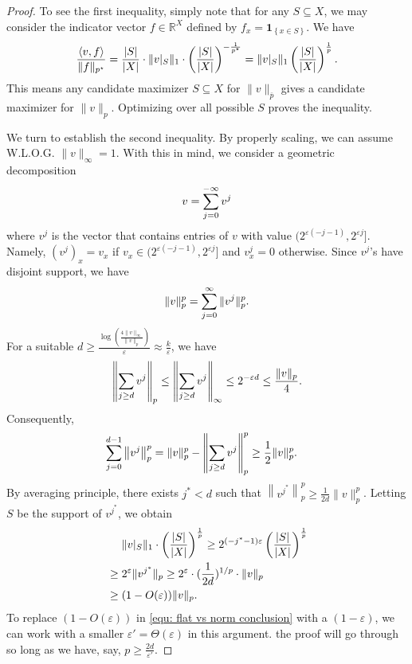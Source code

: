 \documentclass[11pt]{article}
\newcommand{\1}{ \mathbbm{1}}
\newcommand{\one}[1]{\mathbf{1}_{\left\{#1\right\}}}
\newcommand{\eps}{\varepsilon}
\begin{document}
\begin{proof}
    To see the first inequality, simply note that for any $S\subseteq X$, we may consider the indicator vector $f\in \mathbb{R}^{X}$ defined by $f_x = \one{x\in S}$. We have
    \begin{align}
        \frac{\langle v, f\rangle}{\|f\|_{p^\star}} = \frac{|S|}{|X|} \cdot \| v|_S \|_1 \cdot \left( \frac{|S|}{|X|} \right)^{-\frac{1}{p^\star}}  = \| v|_S\|_1 \left( \frac{|S|}{|X|} \right)^{\frac{1}{p}}.  \notag
    \end{align}
    This means any candidate maximizer $S\subseteq X$ for $\|v\|_{\overline{p}}$ gives a candidate maximizer for $\|v\|_{p}$. Optimizing over all possible $S$ proves the inequality.

    We turn to establish the second inequality. By properly scaling, we can assume W.L.O.G. $\|v\|_{\infty} = 1$. With this in mind, we consider a geometric decomposition 
    \begin{align}
        v = \sum_{j=0}^{-\infty} v^j \notag
    \end{align}
    where $v^j$ is the vector that contains entries of $v$ with value $(2^{\eps (-j-1)},2^{\eps j}]$. Namely, $(v^j)_x = v_x$ if $v_x \in (2^{\eps (-j-1)},2^{\eps j}]$ and $v^j_x = 0$ otherwise. Since $v^j$'s have disjoint support, we have
    \begin{align}
        \|v\|_p^p = \sum_{j=0}^{\infty} \|v^j\|_p^p. \notag
    \end{align}
    For a suitable $d \ge \frac{\log(\frac{4\|v\|_{\infty}}{\|v\|_p})}{\eps} \approx \frac{k}{\eps}$, we have
    \begin{align}
        \left\| \sum_{j \ge d} v^j \right\|_{p} \le \left\| \sum_{j \ge d} v^j \right\|_{\infty} \le 2^{-\eps d} \le \frac{\|v\|_p}{4}. \notag
    \end{align}
    Consequently,
    \begin{align}
        \sum_{j=0}^{d-1} \left\|  v^j \right\|_{p}^p 
        &= \| v\|_p^p - \left\| \sum_{j\ge d} v^j \right\|_{p}^p \ge \frac{1}{2} \|v\|_p^p. \notag
    \end{align}
    By averaging principle, there exists $j^*<d$ such that $\left\|  v^{j^*} \right\|_{p}^p \ge \frac{1}{2d} \|v\|_p^p$. Letting $S$ be the support of $v^{j^*}$, we obtain
    \begin{align}
        &~~~~\| v|_S \|_1 \cdot \left( \frac{|S|}{|X|} \right)^{\frac{1}{p}} \ge 2^{(-j^*-1)\eps } \left( \frac{|S|}{|X|} \right)^{\frac{1}{p}} \notag \\
        &\ge  2^{\eps } \| v^{j^*} \|_p  \ge 2^{\eps }\cdot (\frac{1}{2d})^{1/p}\cdot \|v\|_p \notag \\
        &\ge (1-O(\eps)) \| v\|_p. \label{equ: flat vs norm conclusion}
    \end{align}
    To replace $(1-O(\eps))$ in \eqref{equ: flat vs norm conclusion} with a $(1-\eps)$, we can work with a smaller $\eps' = \Theta(\eps)$ in this argument. the proof will go through so long as we have, say, $p\ge \frac{2 d}{\eps'}$.
\end{proof}
\end{document}
